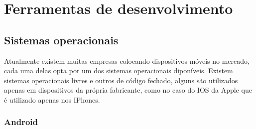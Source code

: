\chapter{Ferramentas de desenvolvimento}
\section{Sistemas operacionais}
Atualmente existem muitas empresas colocando dispositivos móveis no mercado, cada uma delas opta por um dos sistemas operacionais diponíveis.
Existem sistemas operacionais livres e outros de código fechado, alguns são utilizados apenas em dispositivos da própria fabricante, como no caso do IOS da Apple que é utilizado apenas nos IPhones.

\subsection{Android}